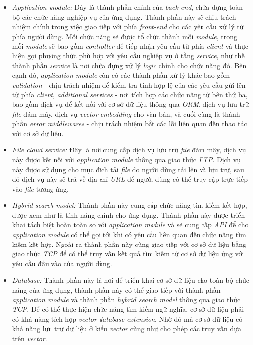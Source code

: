 \begin{itemize}
    \item \textit{Application module:} Đây là thành phần chính của \textit{back-end}, chứa đựng toàn bộ các chức năng nghiệp vụ của ứng dụng. Thành phần này sẽ chịu trách nhiệm chính trong việc giao tiếp với phía \textit{front-end} cho các yêu cầu xử lý từ phía người dùng. Mỗi chức năng sẽ được tổ chức thành mỗi \textit{module}, trong mỗi \textit{module} sẽ bao gồm \textit{controller} để tiếp nhận yêu cầu từ phía \textit{client} và thực hiện gọi phương thức phù hợp với yêu cầu nghiệp vụ ở tầng \textit{service}, như thế thành phần \textit{service} là nơi chứa đựng xử lý \textit{logic} chính cho chức năng đó. Bên cạnh đó, \textit{application module} còn có các thành phần xử lý khác bao gồm \textit{validation} - chịu trách nhiệm để kiểm tra tính hợp lệ của các yêu cầu gửi lên từ phía \textit{client}, \textit{additional services} - nơi tích hợp các chức năng từ bên thứ ba, bao gồm dịch vụ để kết nối với cơ sở dữ liệu thông qua \textit{ORM}, dịch vụ lưu trữ \textit{file} đám mây, dịch vụ \textit{vector embedding} cho văn bản, và cuối cùng là thành phần \textit{error middlewares} - chịu trách nhiệm bắt các lỗi liên quan đến thao tác với cơ sở dữ liệu.
    \item \textit{File cloud service:} Đây là nơi cung cấp dịch vụ lưu trữ \textit{file} đám mây, dịch vụ này được kết nối với \textit{application module} thông qua giao thức \textit{FTP}. Dịch vụ này được sử dụng cho mục đích tải \textit{file} do người dùng tải lên và lưu trữ, sau đó dịch vụ này sẽ trả về địa chỉ \textit{URL} để người dùng có thể truy cập trực tiếp vào \textit{file} tương ứng.
    \item \textit{Hybrid search model:} Thành phần này cung cấp chức năng tìm kiếm kết hợp, được xem như là tính năng chính cho ứng dụng. Thành phần này được triển khai tách biệt hoàn toàn so với \textit{application module} và sẽ cung cấp \textit{API} để cho \textit{application module} có thể gọi tới khi có yêu cầu liên quan đến chức năng tìm kiếm kết hợp. Ngoài ra thành phần này cũng giao tiếp với cơ sở dữ liệu bằng giao thức \textit{TCP} để có thể truy vấn kết quả tìm kiếm từ cơ sở dữ liệu ứng với yêu cầu đầu vào của người dùng.
    \item \textit{Database:} Thành phần này là nơi để triển khai cơ sở dữ liệu cho toàn bộ chức năng của ứng dụng, thành phần này có thể giao tiếp với thành phần \textit{application module} và thành phần \textit{hybrid search model} thông qua giao thức \textit{TCP}. Để có thể thực hiện chức năng tìm kiếm ngữ nghĩa, cơ sở dữ liệu phải có khả năng tích hợp \textit{vector database extension}. Nhờ đó mà cơ sở dữ liệu có khả năng lưu trữ dữ liệu ở kiểu \textit{vector} cũng như cho phép các truy vấn dựa trên \textit{vector}.
\end{itemize}